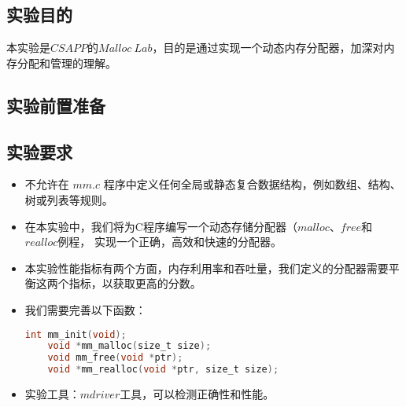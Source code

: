 \subsection{实验目的}
本实验是$CSAPP$的$Malloc\ Lab$，目的是通过实现一个动态内存分配器，加深对内存分配和管理的理解。

\subsection{实验前置准备}

\subsection{实验要求}
\begin{itemize}
    \item 不允许在 $mm.c$ 程序中定义任何全局或静态复合数据结构，例如数组、结构、树或列表等规则。
    \item 在本实验中，我们将为C程序编写一个动态存储分配器（$malloc$、$free$和$realloc$例程，
    实现一个正确，高效和快速的分配器。
    \item 本实验性能指标有两个方面，内存利用率和吞吐量，我们定义的分配器需要平衡这两个指标，以获取更高的分数。
    \item 我们需要完善以下函数：
    \begin{lstlisting}[language = C , title = { Function List } ]
    int mm_init(void);
    void *mm_malloc(size_t size);
    void mm_free(void *ptr);
    void *mm_realloc(void *ptr, size_t size);
    \end{lstlisting}
    \item 实验工具：$mdriver$工具，可以检测正确性和性能。
\end{itemize}




